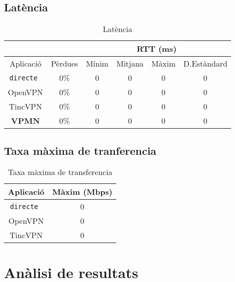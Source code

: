 \subsection{Latència}
\begin{table}[htb]
\begin{center}
\begin{tabular}{|c|c|c|c|c|c|}
\multicolumn{2}{c}{} & \multicolumn{4}{|c|}{RTT (ms)} \\ \hline
Aplicació & Pèrdues & Mínim & Mitjana & Màxim & D.Estàndard \\ \hline \hline
\tt directe & 0\% & 0 & 0 & 0 & 0 \\ \hline
OpenVPN & 0\% & 0 & 0 & 0 & 0 \\ \hline
TincVPN & 0\% & 0 & 0 & 0 & 0 \\ \hline
\bf VPMN & 0\% & 0 & 0 & 0 & 0 \\ \hline
\end{tabular}
\end{center}
\begin{center}
\caption{Latència}
\label{T:lat}
\end{center}
\end{table}

\subsection{Taxa màxima de tranferencia}
\begin{table}[htb]
\begin{center}
\begin{tabular}{|c|c|}
\hline
Aplicació & Màxim (Mbps) \\ \hline \hline
\tt directe & 0 \\ \hline
OpenVPN & 0 \\ \hline
TincVPN & 0 \\ \hline
\end{tabular}
\end{center}
\begin{center}
\caption{Taxa màxima de transferencia}
\label{T:tax}
\end{center}
\end{table}

\section{Anàlisi de resultats}
